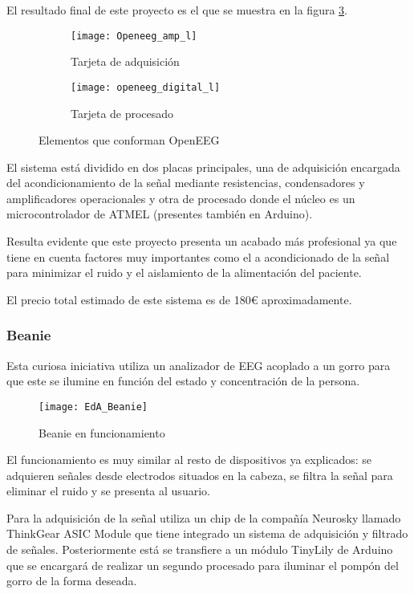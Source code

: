 El resultado final de este proyecto es el que se muestra en la figura \ref{fig:OpenEEG}.

\begin{figure}[h]
  \centering
  \begin{subfigure}[b]{6.5cm}
   	\centering
    \texttt{[image: Openeeg\_amp\_l]}
    \caption{Tarjeta de adquisición}
    \label{fig:Openeeg_amp_l}
  \end{subfigure}
  \begin{subfigure}[b]{6.5cm}
  	\centering
    \texttt{[image: openeeg\_digital\_l]}
    \caption{Tarjeta de procesado}
    \label{fig:openeeg_digital_l}
  \end{subfigure}
  \caption{Elementos que conforman OpenEEG \cite{OpenEEG}}
  \label{fig:OpenEEG}
\end{figure}

El sistema está dividido en dos placas principales, una de adquisición encargada del acondicionamiento de la señal mediante resistencias, condensadores y amplificadores operacionales y otra de procesado donde el núcleo es un microcontrolador de ATMEL (presentes también en Arduino). 

Resulta evidente que este proyecto presenta un acabado más profesional ya que tiene en cuenta factores muy importantes como el a acondicionado de la señal para minimizar el ruido y el aislamiento de la alimentación del paciente.

El precio total estimado de este sistema es de 180€ aproximadamente.

\subsubsection{Beanie}

Esta curiosa iniciativa utiliza un analizador de \acrshort{EEG} acoplado a un gorro para que este se ilumine en función del estado y concentración de la persona.

\begin{figure} [h]
    \centering
    \texttt{[image: EdA\_Beanie]}
    \caption{Beanie en funcionamiento \cite{beanie}}
    \label{fig:EdA_Beanie}
\end{figure}

El funcionamiento es muy similar al resto de dispositivos ya explicados: se adquieren señales desde electrodos situados en la cabeza, se filtra la señal para eliminar el ruido y se presenta al usuario.

Para la adquisición de la señal utiliza un chip de la compañía Neurosky llamado ThinkGear ASIC Module que tiene integrado un sistema de adquisición y filtrado de señales. Posteriormente está se transfiere a un módulo TinyLily de Arduino que se encargará de realizar un segundo procesado para iluminar el pompón del gorro de la forma deseada.

